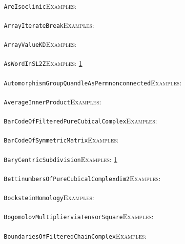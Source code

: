 \documentclass[a4paper,11pt]{report}
\begin{document}
{{ \\
 \texttt{AreIsoclinic}{\nobreakspace}{\nobreakspace}{\nobreakspace}{\nobreakspace}\textsc{Examples:} \\
 \\
 \texttt{ArrayIterateBreak}{\nobreakspace}{\nobreakspace}{\nobreakspace}{\nobreakspace}\textsc{Examples:} \\
 \\
 \texttt{ArrayValueKD}{\nobreakspace}{\nobreakspace}{\nobreakspace}{\nobreakspace}\textsc{Examples:} \\
 \\
 \texttt{AsWordInSL2Z}{\nobreakspace}{\nobreakspace}{\nobreakspace}{\nobreakspace}\textsc{Examples:} \href{tutorial/chap10.html} {1}{\nobreakspace} \\
 \\
 \texttt{AutomorphismGroupQuandleAsPerm{\textunderscore}nonconnected}{\nobreakspace}{\nobreakspace}{\nobreakspace}{\nobreakspace}\textsc{Examples:} \\
 \\
 \texttt{AverageInnerProduct}{\nobreakspace}{\nobreakspace}{\nobreakspace}{\nobreakspace}\textsc{Examples:} \\
 \\
 \texttt{BarCodeOfFilteredPureCubicalComplex}{\nobreakspace}{\nobreakspace}{\nobreakspace}{\nobreakspace}\textsc{Examples:} \\
 \\
 \texttt{BarCodeOfSymmetricMatrix}{\nobreakspace}{\nobreakspace}{\nobreakspace}{\nobreakspace}\textsc{Examples:} \\
 \\
 \texttt{BaryCentricSubdivision}{\nobreakspace}{\nobreakspace}{\nobreakspace}{\nobreakspace}\textsc{Examples:} \href{tutorial/chap8.html} {1}{\nobreakspace} \\
 \\
 \texttt{BettinumbersOfPureCubicalComplex{\textunderscore}dim{\textunderscore}2}{\nobreakspace}{\nobreakspace}{\nobreakspace}{\nobreakspace}\textsc{Examples:} \\
 \\
 \texttt{BocksteinHomology}{\nobreakspace}{\nobreakspace}{\nobreakspace}{\nobreakspace}\textsc{Examples:} \\
 \\
 \texttt{BogomolovMultiplier{\textunderscore}viaTensorSquare}{\nobreakspace}{\nobreakspace}{\nobreakspace}{\nobreakspace}\textsc{Examples:} \\
 \\
 \texttt{BoundariesOfFilteredChainComplex}{\nobreakspace}{\nobreakspace}{\nobreakspace}{\nobreakspace}\textsc{Examples:} \\
}}
\end{document}
